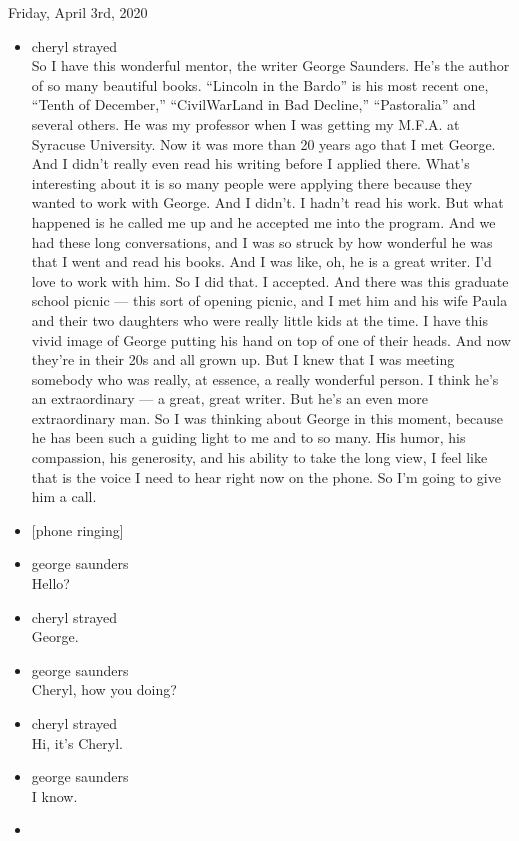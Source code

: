 Friday, April 3rd, 2020

\begin{itemize}
\item
  cheryl strayed\\
  So I have this wonderful mentor, the writer George Saunders. He's the
  author of so many beautiful books. ``Lincoln in the Bardo'' is his
  most recent one, ``Tenth of December,'' ``CivilWarLand in Bad
  Decline,'' ``Pastoralia'' and several others. He was my professor when
  I was getting my M.F.A. at Syracuse University. Now it was more than
  20 years ago that I met George. And I didn't really even read his
  writing before I applied there. What's interesting about it is so many
  people were applying there because they wanted to work with George.
  And I didn't. I hadn't read his work. But what happened is he called
  me up and he accepted me into the program. And we had these long
  conversations, and I was so struck by how wonderful he was that I went
  and read his books. And I was like, oh, he is a great writer. I'd love
  to work with him. So I did that. I accepted. And there was this
  graduate school picnic --- this sort of opening picnic, and I met him
  and his wife Paula and their two daughters who were really little kids
  at the time. I have this vivid image of George putting his hand on top
  of one of their heads. And now they're in their 20s and all grown up.
  But I knew that I was meeting somebody who was really, at essence, a
  really wonderful person. I think he's an extraordinary --- a great,
  great writer. But he's an even more extraordinary man. So I was
  thinking about George in this moment, because he has been such a
  guiding light to me and to so many. His humor, his compassion, his
  generosity, and his ability to take the long view, I feel like that is
  the voice I need to hear right now on the phone. So I'm going to give
  him a call.
\item
  {[}phone ringing{]}
\item
  george saunders\\
  Hello?
\item
  cheryl strayed\\
  George.
\item
  george saunders\\
  Cheryl, how you doing?
\item
  cheryl strayed\\
  Hi, it's Cheryl.
\item
  george saunders\\
  I know.
\item

\end{itemize}
